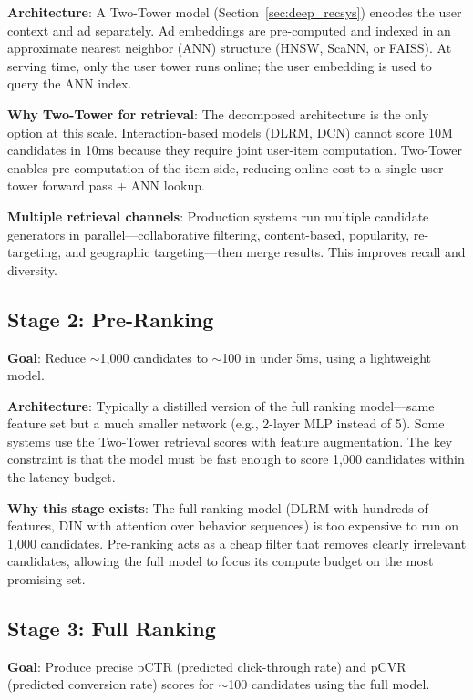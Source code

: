 \textbf{Architecture}: A Two-Tower model (Section~\ref{sec:deep_recsys}) encodes the user context and ad separately. Ad embeddings are pre-computed and indexed in an approximate nearest neighbor (ANN) structure (HNSW, ScaNN, or FAISS). At serving time, only the user tower runs online; the user embedding is used to query the ANN index.

\textbf{Why Two-Tower for retrieval}: The decomposed architecture is the only option at this scale. Interaction-based models (DLRM, DCN) cannot score 10M candidates in 10ms because they require joint user-item computation. Two-Tower enables pre-computation of the item side, reducing online cost to a single user-tower forward pass + ANN lookup.

\textbf{Multiple retrieval channels}: Production systems run multiple candidate generators in parallel---collaborative filtering, content-based, popularity, re-targeting, and geographic targeting---then merge results. This improves recall and diversity.

\subsection{Stage 2: Pre-Ranking}

\textbf{Goal}: Reduce $\sim$1,000 candidates to $\sim$100 in under 5ms, using a lightweight model.

\textbf{Architecture}: Typically a distilled version of the full ranking model---same feature set but a much smaller network (e.g., 2-layer MLP instead of 5). Some systems use the Two-Tower retrieval scores with feature augmentation. The key constraint is that the model must be fast enough to score 1,000 candidates within the latency budget.

\textbf{Why this stage exists}: The full ranking model (DLRM with hundreds of features, DIN with attention over behavior sequences) is too expensive to run on 1,000 candidates. Pre-ranking acts as a cheap filter that removes clearly irrelevant candidates, allowing the full model to focus its compute budget on the most promising set.

\subsection{Stage 3: Full Ranking}

\textbf{Goal}: Produce precise pCTR (predicted click-through rate) and pCVR (predicted conversion rate) scores for $\sim$100 candidates using the full model.

